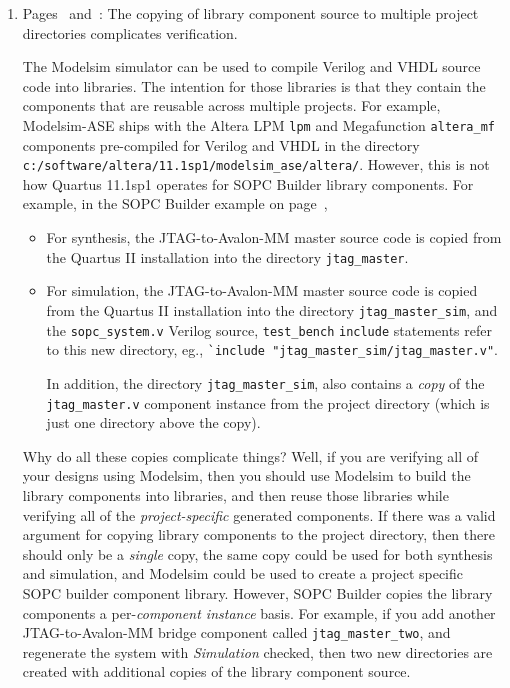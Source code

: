 \documentclass[10pt,twoside]{article}
\begin{document}
\begin{enumerate}
\item Pages~\pageref{bug:6a} and~\pageref{bug:6b}: The copying of library component source to
multiple project directories complicates verification.

The Modelsim simulator can be used to compile Verilog and VHDL source code
into libraries. The intention for those libraries is that they contain
the components that are reusable across multiple projects. For example,
Modelsim-ASE ships with the Altera LPM \verb+lpm+ and Megafunction 
\verb+altera_mf+ components pre-compiled for Verilog and VHDL in the 
directory \verb+c:/software/altera/11.1sp1/modelsim_ase/altera/+.
%
However, this is not how Quartus 11.1sp1 operates for SOPC Builder
library components. For example, in the SOPC Builder example
on page~\pageref{bug:6a},
%
\begin{itemize}
%
\item For synthesis, the JTAG-to-Avalon-MM master source code is 
copied from the Quartus II installation into the directory 
\verb+jtag_master+.
%
\item For simulation, the JTAG-to-Avalon-MM master source code is 
copied from the Quartus II installation into the directory 
\verb+jtag_master_sim+, and the \verb+sopc_system.v+ Verilog source,
\verb+test_bench+ \verb+include+ statements refer to this new 
directory, eg., \newline\verb+`include "jtag_master_sim/jtag_master.v"+.

In addition, the directory \verb+jtag_master_sim+, also contains
a {\em copy} of the \verb+jtag_master.v+ component instance
from the project directory (which is just one directory above
the copy). 
%
\end{itemize}
%
Why do all these copies complicate things? Well, if you are
verifying all of your designs using Modelsim, then you should
use Modelsim to build the library components into libraries,
and then reuse those libraries while verifying all of the
{\em project-specific} generated components. If there was
a valid argument for copying library components to the project
directory, then there should only be a {\em single} copy,
the same copy could be used for both synthesis and simulation,
and Modelsim could be used to create a project specific
SOPC builder component library. However, SOPC Builder copies
the library components a per-{\em component instance} basis.
For example, if you add another JTAG-to-Avalon-MM bridge 
component called \verb+jtag_master_two+, and regenerate the 
system with  {\em Simulation} checked, then two new directories
are created with additional copies of the library component source.


\end{enumerate}
\end{document}
